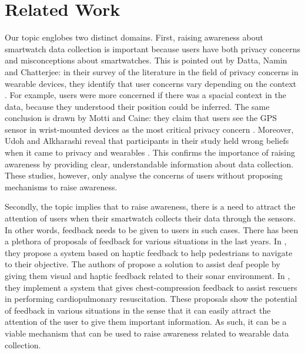 \documentclass[conference, a4paper, 10pt, twocolumn]{IEEEtran}
\begin{document}
\section{\textbf{Related Work}}\label{related}
Our topic englobes two distinct domains. First, raising awareness about smartwatch data collection is important because users have both privacy concerns and misconceptions about smartwatches. This is pointed out by Datta, Namin and Chatterjee: in their survey of the literature in the field of privacy concerns in wearable devices, they identify that user concerns vary depending on the context \cite{datta2018survey}. For example, users were more concerned if there was a spacial context in the data, because they understood their position could be inferred. The same conclusion is drawn by Motti and Caine: they claim that users see the GPS sensor in wrist-mounted devices as the most critical privacy concern \cite{motti2015users}. Moreover, Udoh and Alkharashi reveal that participants in their study held wrong beliefs when it came to privacy and wearables \cite{udoh2016privacy}. This confirms the importance of raising awareness by providing clear, understandable information about data collection. These studies, however, only analyse the concerns of users without proposing mechanisms to raise awareness.

Secondly, the topic implies that to raise awareness, there is a need to attract the attention of users when their smartwatch collects their data through the sensors. In other words, feedback needs to be given to users in such cases. There has been a plethora of proposals of feedback for various situations in the last years. In \cite{dobbelstein2016unconstrained}, they propose a system based on haptic feedback to help pedestrians to navigate to their objective. The authors of \cite{goodman2020evaluating} propose a solution to assist deaf people by giving them visual and haptic feedback related to their sonar environment. In \cite{lee2019smartwatch}, they implement a system that gives chest-compression feedback to assist rescuers in performing cardiopulmonary resuscitation. These proposals show the potential of feedback in various situations in the sense that it can easily attract the attention of the user to give them important information. As such, it can be a viable mechanism that can be used to raise awareness related to wearable data collection.
\end{document}
